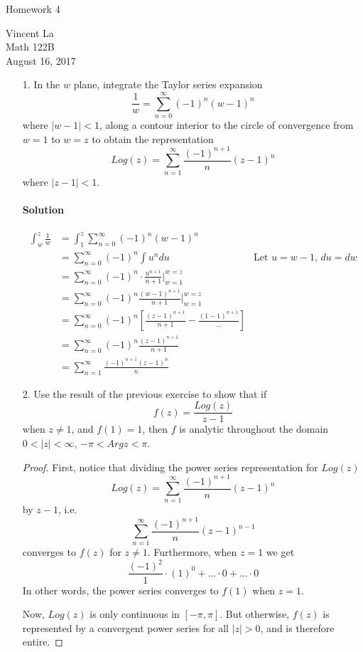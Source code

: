 \documentclass[11pt]{article}
\title{ }
\begin{document}
	\begin{center}	%
		\Large{Homework 4}	%
	\end{center}
	\begin{center}
		Vincent La \\
		Math 122B \\
		August 16, 2017
	\end{center}
	
\begin{enumerate}
	\item[1.] In the $w$ plane, integrate the Taylor series expansion
	\[\frac{1}{w} = \sum^{\infty}_{n=0} (-1)^n(w-1)^n \]
	where $|w - 1| < 1$, along a contour interior to the circle of convergence from $w = 1$ to $w = z$ to obtain the representation
	\[Log(z) = \sum^{\infty}_{n=1} \frac{(-1)^{n+1}}{n}(z-1)^n \]
	where $|z - 1| < 1$.
	
	\paragraph{Solution}
	\[\begin{aligned}
	\int^z_w \frac{1}{w}
	&= \int^z_1 \sum^{\infty}_{n=0}(-1)^n(w-1)^n \\
	&= \sum^{\infty}_{n=0} (-1)^n \int u^n du &\text{Let $u = w - 1$, $du = dw$} \\
	&= \sum^{\infty}_{n=0} (-1)^n  \cdot \frac{u^{n+1}}{n+1}|^{w=z}_{w=1} \\
	&= \sum^{\infty}_{n=0} (-1)^n \frac{(w-1)^{n+1}}{n+1}|^{w=z}_{w=1} \\
	&= \sum^{\infty}_{n=0} (-1)^n [\frac{(z-1)^{n+1}}{n+1} - \frac{(1-1)^{n+1}}{...}] \\
	&= \sum^{\infty}_{n=0} (-1)^n \frac{(z-1)^{n+1}}{n+1} \\
	&= \sum^{\infty}_{n=1} \frac{(-1)^{n+1}(z-1)^n}{n}
	\end{aligned}\]
	
	\item[2.] Use the result of the previous exercise to show that if
	\[f(z) = \frac{Log(z)}{z-1}\]
	when $z \neq 1$, and $f(1) = 1$, then $f$ is analytic throughout the domain $0 < |z| < \infty$, $-\pi < Argz < \pi$.
	
	\begin{proof}
		First, notice that dividing the power series representation for $Log(z)$
		\[Log(z) = \sum^{\infty}_{n=1} \frac{(-1)^{n+1}}{n}(z-1)^n \]
 		by $z-1$, i.e.
 		\[\sum^{\infty}_{n=1} \frac{(-1)^{n+1}}{n}(z-1)^{n-1} \]
 		converges to $f(z)$ for $z \neq 1$. Furthermore, 
 		when $z = 1$ we get
	 	 \[	\frac{(-1)^2}{1}\cdot(1)^0 + ...\cdot0 + ...\cdot0 \]
		In other words, the power series converges to $f(1)$ when $z = 1$.
		
		\bigskip
		
		Now, $Log(z)$ is only continuous in $[-\pi, \pi]$. But otherwise, $f(z)$ is represented by a convergent power series for all $|z| > 0$, and is therefore entire.
	\end{proof}
\end{enumerate}
\end{document}
